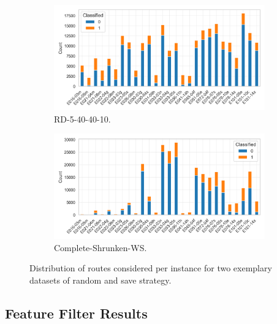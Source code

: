 \begin{figure}[ht]
    \centering
    \begin{subfigure}[t]{.5\textwidth}
        \centering
        \includegraphics[width=\linewidth]{pictures/dataset_structure/distribution_plot_RandomData_5_40_40_10.png}
        \caption{RD-5-40-40-10.}
    \end{subfigure}%
    \begin{subfigure}[t]{.5\textwidth}
        \centering
        \includegraphics[width=\linewidth]{pictures/dataset_structure/distribution_plot_gendreau_28880_600_WS_shrinked094.png}
        \caption{Complete-Shrunken-WS.}
    \end{subfigure}
    \caption[Distribution of routes considered per instance for two exemplary datasets of random and save strategy.]
    {Distribution of routes considered per instance for two exemplary datasets of random and save strategy.}
    \label{fig:comparison_noroutes_perInstancce}
\end{figure}

\subsection{Feature Filter Results}
\label{sec:feature_filter_results}

